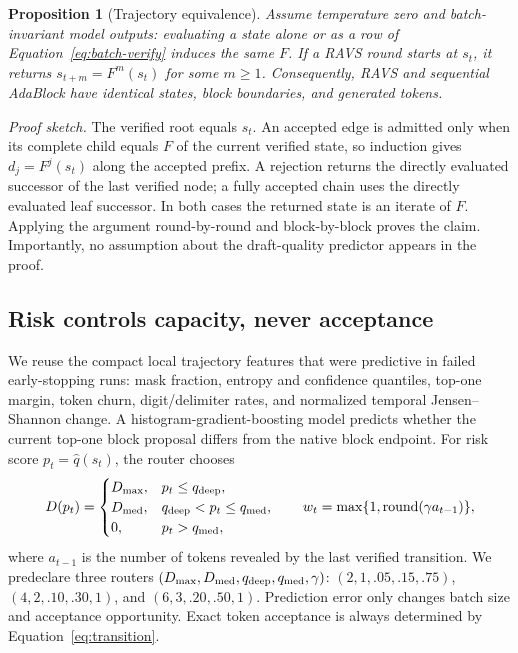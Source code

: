 \documentclass{article}
\newcommand{\method}{\textsc{RAVS}\xspace}
\newtheorem{proposition}{Proposition}
\begin{document}
\begin{proposition}[Trajectory equivalence]
Assume temperature zero and batch-invariant model outputs: evaluating a state alone or as a row of
Equation~\ref{eq:batch-verify} induces the same $F$. If a \method round starts at $s_t$, it returns
$s_{t+m}=F^m(s_t)$ for some $m\ge1$. Consequently, \method and sequential AdaBlock have identical
states, block boundaries, and generated tokens.
\end{proposition}

\noindent\textit{Proof sketch.}
The verified root equals $s_t$. An accepted edge is admitted only when its complete child equals
$F$ of the current verified state, so induction gives $d_j=F^j(s_t)$ along the accepted prefix. A
rejection returns the directly evaluated successor of the last verified node; a fully accepted chain
uses the directly evaluated leaf successor. In both cases the returned state is an iterate of $F$.
Applying the argument round-by-round and block-by-block proves the claim. Importantly, no assumption
about the draft-quality predictor appears in the proof.

\subsection{Risk controls capacity, never acceptance}

We reuse the compact local trajectory features that were predictive in failed early-stopping runs:
mask fraction, entropy and confidence quantiles, top-one margin, token churn, digit/delimiter rates,
and normalized temporal Jensen--Shannon change. A histogram-gradient-boosting model predicts whether
the current top-one block proposal differs from the native block endpoint. For risk score
$p_t=\widehat q(s_t)$, the router chooses
\begin{equation}
 D(p_t)=
 \begin{cases}
 D_{\max}, & p_t\le q_{\rm deep},\\
 D_{\rm med}, & q_{\rm deep}<p_t\le q_{\rm med},\\
 0, & p_t>q_{\rm med},
 \end{cases}
 \qquad
 w_t=\max\{1,\operatorname{round}(\gamma a_{t-1})\},
 \label{eq:router}
\end{equation}
where $a_{t-1}$ is the number of tokens revealed by the last verified transition. We predeclare
three routers $(D_{\max},D_{\rm med},q_{\rm deep},q_{\rm med},\gamma)$:
$(2,1,.05,.15,.75)$, $(4,2,.10,.30,1)$, and $(6,3,.20,.50,1)$. Prediction error only changes
batch size and acceptance opportunity. Exact token acceptance is always determined by
Equation~\ref{eq:transition}.
\end{document}
